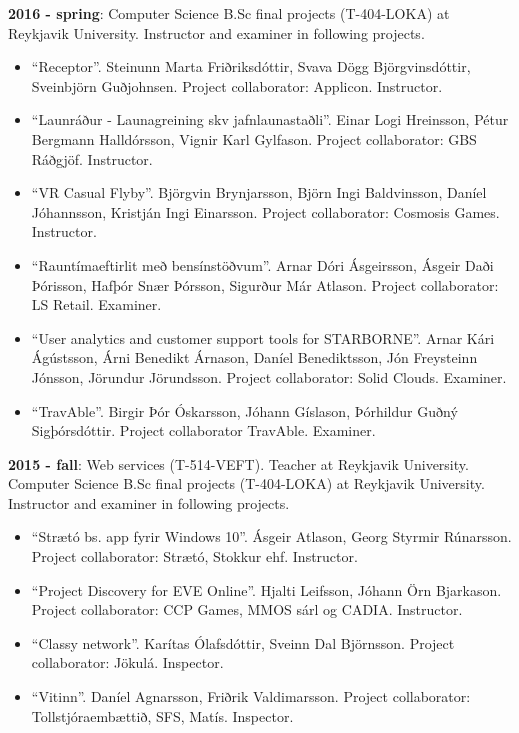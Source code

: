 \textbf{2016 - spring}:
Computer Science B.Sc final projects (T-404-LOKA) at Reykjavik University.
Instructor and examiner in following projects.

\begin{itemize}
\item ``Receptor''. Steinunn Marta Friðriksdóttir, Svava Dögg Björgvinsdóttir,
    Sveinbjörn Guðjohnsen. Project collaborator: Applicon. Instructor.

\item ``Launráður - Launagreining skv jafnlaunastaðli''. Einar Logi Hreinsson,
    Pétur Bergmann Halldórsson, Vignir Karl Gylfason. Project collaborator: GBS
        Ráðgjöf. Instructor.

\item ``VR Casual Flyby''. Björgvin Brynjarsson, Björn Ingi Baldvinsson, Daníel
    Jóhannsson, Kristján Ingi Einarsson. Project collaborator: Cosmosis Games.
        Instructor.

\item ``Rauntímaeftirlit með bensínstöðvum''. Arnar Dóri Ásgeirsson, Ásgeir
    Daði Þórisson, Hafþór Snær Þórsson, Sigurður Már Atlason. Project
        collaborator: LS Retail. Examiner.

\item ``User analytics and customer support tools for STARBORNE''. Arnar Kári
    Ágústsson, Árni Benedikt Árnason, Daníel Benediktsson, Jón Freysteinn
        Jónsson, Jörundur Jörundsson. Project collaborator: Solid Clouds.
        Examiner.

\item ``TravAble''. Birgir Þór Óskarsson, Jóhann Gíslason, Þórhildur Guðný
    Sigþórsdóttir. Project collaborator TravAble. Examiner.
\end{itemize}


\textbf{2015 - fall}: Web services (T-514-VEFT). Teacher at Reykjavik
University. Computer Science B.Sc final projects (T-404-LOKA) at Reykjavik
University. Instructor and examiner in following projects.

\begin{itemize}
\item ``Strætó bs. app fyrir Windows 10''. Ásgeir Atlason, Georg Styrmir
    Rúnarsson. Project collaborator: Strætó, Stokkur ehf. Instructor.

\item ``Project Discovery for EVE Online''. Hjalti Leifsson, Jóhann Örn
    Bjarkason. Project collaborator: CCP Games, MMOS sárl og CADIA. Instructor.

\item ``Classy network''. Karítas Ólafsdóttir, Sveinn Dal Björnsson. Project
    collaborator: Jökulá. Inspector.

\item ``Vitinn''. Daníel Agnarsson, Friðrik Valdimarsson. Project collaborator:
    Tollstjóraembættið, SFS, Matís. Inspector.
\end{itemize}



